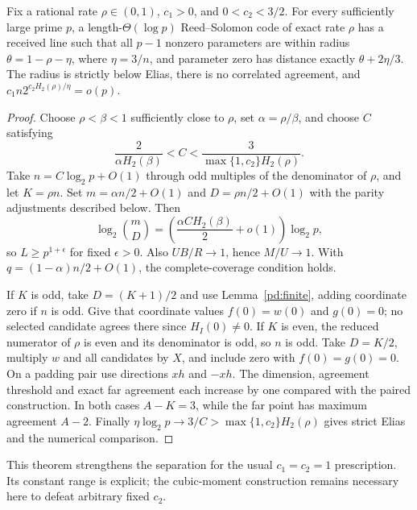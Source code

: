 \begin{theorem}
\label{pd:punctured-line}
Fix a rational rate $\rho\in(0,1)$, $c_1>0$, and $0<c_2<3/2$.
For every sufficiently large prime $p$, a length-$\Theta(\log p)$
Reed--Solomon code of exact rate $\rho$ has a received line such that
all $p-1$ nonzero parameters are within radius
$\theta=1-\rho-\eta$, where $\eta=3/n$, and parameter zero has distance
exactly $\theta+2\eta/3$. The radius is strictly below Elias, there is
no correlated agreement, and
$c_1n2^{c_2H_2(\rho)/\eta}=o(p)$.
\end{theorem}
\begin{proof}
Choose $\rho<\beta<1$ sufficiently close to $\rho$, set
$\alpha=\rho/\beta$, and choose $C$ satisfying
\[
 \frac{2}{\alpha H_2(\beta)}<C<
 \frac{3}{\max\{1,c_2\}H_2(\rho)}.
\]
Take $n=C\log_2p+O(1)$ through odd multiples of the denominator of
$\rho$, and let $K=\rho n$. Set $m=\alpha n/2+O(1)$ and
$D=\rho n/2+O(1)$ with the parity adjustments described below.
Then
\[
 \log_2\binom mD=
 \left(\frac{\alpha C H_2(\beta)}2+o(1)\right)\log_2p,
\]
so $L\ge p^{1+\epsilon}$ for fixed $\epsilon>0$.
Also $UB/R\to1$, hence $M/U\to1$. With
$q=(1-\alpha)n/2+O(1)$, the complete-coverage condition holds.

If $K$ is odd, take $D=(K+1)/2$ and use Lemma~\ref{pd:finite},
adding coordinate zero if $n$ is odd. Give that coordinate values
$f(0)=w(0)$ and $g(0)=0$; no selected candidate agrees there since
$H_I(0)\ne0$. If $K$ is even, the reduced numerator of $\rho$ is
even and its denominator is odd, so $n$ is odd. Take $D=K/2$,
multiply $w$ and all candidates by $X$, and include zero with
$f(0)=g(0)=0$. On a padding pair use directions $xh$ and $-xh$.
The dimension, agreement threshold and exact far agreement each
increase by one compared with the paired construction. In both cases
$A-K=3$, while the far point has maximum agreement $A-2$.
Finally $\eta\log_2p\to3/C>\max\{1,c_2\}H_2(\rho)$ gives
strict Elias and the numerical comparison.
\end{proof}

This theorem strengthens the separation for the usual $c_1=c_2=1$
prescription. Its constant range is explicit; the cubic-moment
construction remains necessary here to defeat arbitrary fixed $c_2$.
